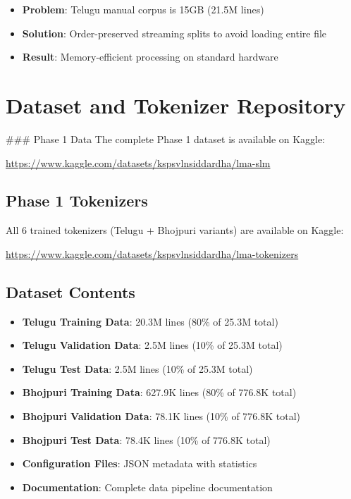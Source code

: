 \documentclass[11pt,a4paper]{article}
\begin{document}
\begin{itemize}
    \item \textbf{Problem}: Telugu manual corpus is 15GB (21.5M lines)
    \item \textbf{Solution}: Order-preserved streaming splits to avoid loading entire file
    \item \textbf{Result}: Memory-efficient processing on standard hardware
\end{itemize}

\section{Dataset and Tokenizer Repository}

### Phase 1 Data
The complete Phase 1 dataset is available on Kaggle:

\begin{center}
    \small \url{https://www.kaggle.com/datasets/kspsvlnsiddardha/lma-slm}
\end{center}

\subsection{Phase 1 Tokenizers}

All 6 trained tokenizers (Telugu + Bhojpuri variants) are available on Kaggle:

\begin{center}
    \small \url{https://www.kaggle.com/datasets/kspsvlnsiddardha/lma-tokenizers}
\end{center}

\subsection{Dataset Contents}

\begin{itemize}
    \item \textbf{Telugu Training Data}: 20.3M lines (80\% of 25.3M total)
    \item \textbf{Telugu Validation Data}: 2.5M lines (10\% of 25.3M total)
    \item \textbf{Telugu Test Data}: 2.5M lines (10\% of 25.3M total)
    \item \textbf{Bhojpuri Training Data}: 627.9K lines (80\% of 776.8K total)
    \item \textbf{Bhojpuri Validation Data}: 78.1K lines (10\% of 776.8K total)
    \item \textbf{Bhojpuri Test Data}: 78.4K lines (10\% of 776.8K total)
    \item \textbf{Configuration Files}: JSON metadata with statistics
    \item \textbf{Documentation}: Complete data pipeline documentation
\end{itemize}
\end{document}
